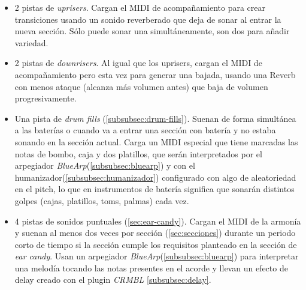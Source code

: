 \begin{itemize}
\item 2 pistas de \textit{uprisers}. Cargan el MIDI de acompañamiento para crear transiciones usando un sonido reverberado que deja de sonar al entrar la nueva sección. Sólo puede sonar una simultáneamente, son dos para añadir variedad.

\item 2 pistas de \textit{downrisers}. Al igual que los uprisers, cargan el MIDI de acompañamiento pero esta vez para generar una bajada, usando una Reverb con menos ataque (alcanza más volumen antes) que baja de volumen progresivamente.

\item Una pista de \textit{drum fills} (\ref{subsubsec:drum-fills}). Suenan de forma simultánea a las baterías o cuando va a entrar una sección con batería y no estaba sonando en la sección actual. Carga un MIDI especial que tiene marcadas las notas de bombo, caja y dos platillos, que serán interpretados por el arpegiador \textit{BlueArp}(\ref{subsubsec:bluearp}) y con el humanizador(\ref{subsubsec:humanizador}) configurado con algo de aleatoriedad en el pitch, lo que en instrumentos de batería significa que sonarán distintos golpes (cajas, platillos, toms, palmas) cada vez.

\item 4 pistas de sonidos puntuales (\ref{sec:ear-candy}). Cargan el MIDI de la armonía y suenan al menos dos veces por sección (\ref{sec:secciones}) durante un periodo corto de tiempo si la sección cumple los requisitos planteado en la sección de \textit{ear candy}. Usan un arpegiador \textit{BlueArp}(\ref{subsubsec:bluearp}) para interpretar una melodía tocando las notas presentes en el acorde y llevan un efecto de delay creado con el plugin \textit{CRMBL} \ref{subsubsec:delay}.
\end{itemize}

